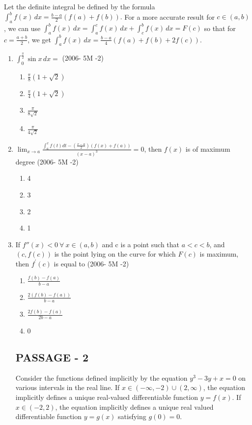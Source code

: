 \documentclass[journal,12pt,onecolumn]{IEEEtran}
\theoremstyle{remark}
\begin{document}
Let the definite integral be defined by the formula
$\int_a^b f(x) \, dx = \frac{b-a}{2} ( f(a) + f(b) ).$
For a more accurate result for $ c \in (a, b) $, we can use
$\int_a^b f(x) \, dx = \int_a^c f(x) \, dx + \int_c^b f(x) \, dx = F(c)$
so that for \( c = \frac{a+b}{2} \), we get
$\int_a^b f(x) \, dx = \frac{b-a}{4}( f(a) + f(b) + 2f(c) )$.
\begin{enumerate}
\item $\int_0^{\frac{\pi}{2}} \sin x \, dx =$
\hfill{(2006- 5M -2)}
\begin{enumerate}
    \item $ \frac{\pi}{8} ( 1 + \sqrt{2} ) $
    \item $\frac{\pi}{4} ( 1 + \sqrt{2} ) $
    \item $ \frac{\pi}{8\sqrt{2}}$
    \item  $\frac{\pi}{4\sqrt{2}}$ 
\end{enumerate}
\item $\lim_{x \to a} \frac{\int_a^x f(t)dt - (\frac{x-a}{2})(f(x) + f(a))}{(x - a)^3} = 0 $, then  $f(x)$  is 
 of maximum degree 
 \hfill{(2006- 5M -2)}
 \begin{enumerate}
    \item  4 
    \item  3 
    \item  2 
    \item  1
  \end{enumerate}
 \item If $ f''(x) < 0 \ \forall \ x \in (a, b) $ and  c  is a point such that $a < c < b $, and $(c, f(c))$ is the point lying on the curve for which $F(c) $ is maximum, then $f^{\prime}(c) $ is equal to
 \hfill{(2006- 5M -2)}
 \begin{enumerate}
    \item  $\frac{f(b) - f(a)}{b - a} $
    \item  $ \frac{2(f(b) - f(a))}{b - a} $
    \item  $ \frac{2f(b) - f(a)}{2b - a} $
    \item  0
\end{enumerate}
\subsection{PASSAGE - 2}
 
 Consider the functions defined implicitly by the equation 
$y^3 - 3y + x = 0$
on various intervals in the real line. If $ x \in (-\infty, -2) \cup (2, \infty) $, the equation implicitly defines a unique real-valued differentiable function $ y = f(x) $. If $x \in (-2, 2)$, the equation implicitly defines a unique real valued differentiable function $y = g(x)$ satisfying $ g(0) = 0$.


\end{enumerate}
\end{document}
